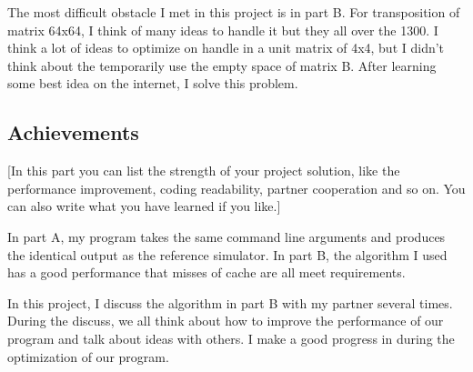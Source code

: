 \documentclass{article}
\begin{document}
The most difficult obstacle I met in this project is in part B. For transposition of matrix 64x64, I think of many ideas to handle it but they all over the 1300. I think a lot of ideas to optimize on handle in a unit matrix of 4x4, but I didn't think about the temporarily use the empty space of matrix B. After learning some best idea on the internet, I solve this problem. 

\subsection{Achievements}

[In this part you can list the strength of your project solution, like the performance improvement, coding readability, partner cooperation and so on. You can also write what you have learned if you like.]

In part A, my program takes the same command line arguments and produces the identical output as the reference simulator. In part B, the algorithm I used has a good performance that misses of cache are all meet requirements.

In this project, I discuss the algorithm in part B with my partner several times. During the discuss, we all think about how to improve the performance of our program and talk about ideas with others. I make a good progress in during the optimization of our program.







\end{document}
